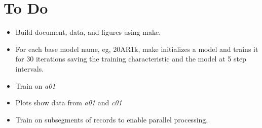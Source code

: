 \documentclass[12pt]{article}
\begin{document}
\section{To Do}
\label{sec:todo}

\begin{itemize}
\item Build document, data, and figures using make.
\item For each base model name, eg, 20AR1k, make initializes a model
  and trains it for 30 iterations saving the training characteristic
  and the model at 5 step intervals.
\item Train on \emph{a01}
\item Plots show data from \emph{a01} and \emph{c01}
\item Train on subsegments of records to enable parallel processing.
\end{itemize}
\end{document}
